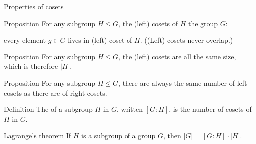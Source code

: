 \documentclass[8pt, handout]{beamer}
\begin{document}

\begin{frame}{Properties of cosets}
  \begin{block}{Proposition}
    For any subgroup $H\leq G$, the (left) cosets of $H$ 
    the group $G$:

    every element $g\in G$ lives in  (left) coset of $H$. ((Left) cosets never overlap.)
  \end{block}
  \begin{block}{Proposition}
    For any subgroup $H\leq G$, the (left) cosets are all the same size, which is therefore $|H|$.
  \end{block}
  \begin{block}{Proposition}
    For any subgroup $H\leq G$, there are always the same number of left cosets as there are of right cosets.
  \end{block}
  \begin{block}{Definition}
    The  of a subgroup $H$ in $G$, written $[G:H]$, is the number of cosets of $H$ in $G$.
  \end{block}
  \begin{block}{Lagrange's theorem}
    If $H$ is a subgroup of a  group $G$, then $|G| = [G:H]\cdot |H|$.
  \end{block}
\end{frame}

\end{document}
